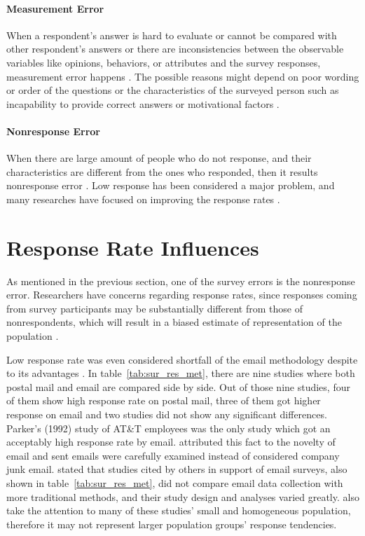 \paragraph{Measurement Error}
When a respondent's answer is hard to evaluate or cannot be compared with other respondent's answers or there are inconsistencies between the observable variables like opinions, behaviors, or attributes and the survey responses, measurement error happens \citetext{\citealp[page 9]{Dillman2006}; \citealp{Dillman1991}}. The possible reasons might depend on poor wording or order of the questions or the characteristics of the surveyed person such as incapability to provide correct answers or motivational factors \citep{Dillman1991}.

\paragraph{Nonresponse Error}
When there are large amount of people who do not response, and their characteristics are different from the ones who responded, then it results nonresponse error \citep[page 9]{Dillman2006}. Low response has been considered a major problem, and many researches have focused on improving the response rates \citep{Dillman1991}.

\section{Response Rate Influences}
\label{sec:2.2:ResRatInf}

As mentioned in the previous section, one of the survey errors is the nonresponse error. Researchers have concerns regarding response rates, since responses coming from survey participants may be substantially different from those of nonrespondents, which will result in a biased estimate of representation of the population \citep{Bogen1996}.
\vspace{1cm}

Low response rate was even considered shortfall of the email methodology despite to its advantages \citep{BachmannD.ElfrinkJ.&Vazzana1999}. In table~\ref{tab:sur_res_met}, there are nine studies where both postal mail and email are compared side by side. Out of those nine studies, four of them show high response rate on postal mail, three of them got higher response on email and two studies did not show any significant differences. Parker's (1992) study of AT\&T employees was the only study which got an acceptably high response rate by email. \cite{Schaefer1998} attributed this fact to the novelty of email and sent emails were carefully examined instead of considered company junk email. \cite{Mavis1998} stated that studies cited by others in support of email surveys, also shown in table~\ref{tab:sur_res_met}, did not compare email data collection with more traditional methods, and their study design and analyses varied greatly. \cite{Sheehan2006} also take the attention to many of these studies' small and homogeneous population, therefore it may not represent larger population groups' response tendencies.
\vspace{1cm}

